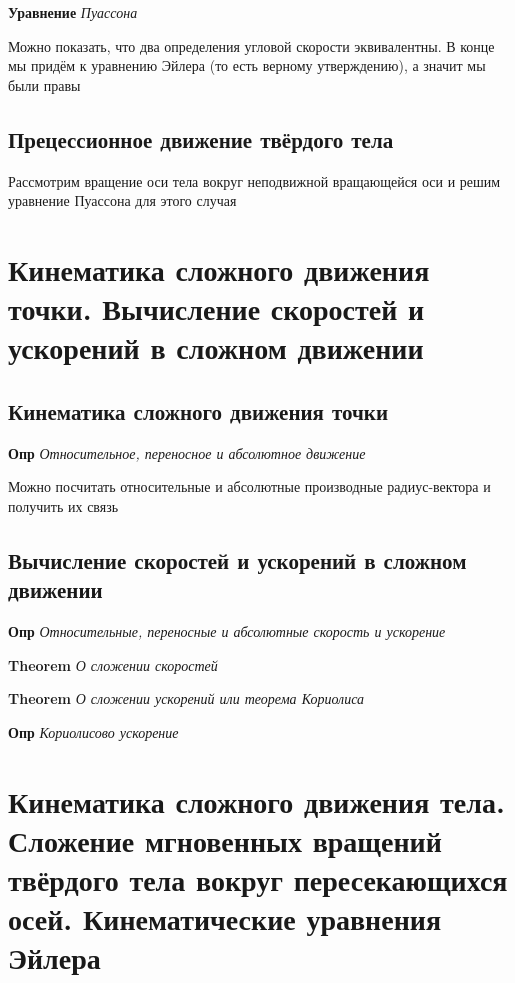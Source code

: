 \documentclass[a4paper, 14pt]{article}
\begin{document}
    \textbf{Уравнение} \textit{Пуассона}
    
    Можно показать, что два определения угловой скорости эквивалентны.
    В конце мы придём к уравнению Эйлера (то есть верному утверждению), а значит мы были правы
    
    \subsection{Прецессионное движение твёрдого тела}
    
    Рассмотрим вращение оси тела вокруг неподвижной вращающейся оси и решим уравнение Пуассона для этого случая
    
    \section{Кинематика сложного движения точки.
    Вычисление скоростей и ускорений в сложном движении}
    
    \subsection{Кинематика сложного движения точки}
    
    \textbf{Опр} \textit{Относительное, переносное и абсолютное движение}
    
    Можно посчитать относительные и абсолютные производные радиус-вектора и получить их связь
    
    \subsection{Вычисление скоростей и ускорений в сложном движении}
    
    \textbf{Опр} \textit{Относительные, переносные и абсолютные скорость и ускорение}
    
    \textbf{Theorem} \textit{О сложении скоростей}
    
    \textbf{Theorem} \textit{О сложении ускорений или теорема Кориолиса}
    
    \textbf{Опр} \textit{Кориолисово ускорение}
    
    \section{Кинематика сложного движения тела.
    Сложение мгновенных вращений твёрдого тела вокруг пересекающихся осей.
    Кинематические уравнения Эйлера}
    
\end{document}
